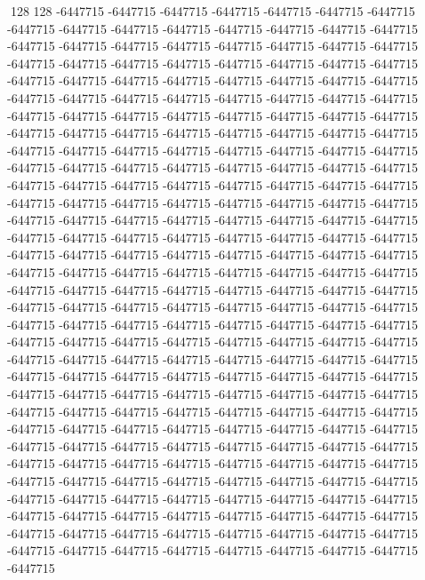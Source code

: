 128 128
-6447715 -6447715 -6447715 -6447715 -6447715 -6447715 -6447715 -6447715 -6447715 -6447715 -6447715 -6447715 -6447715 -6447715 -6447715 -6447715 -6447715 -6447715 -6447715 -6447715 -6447715 -6447715 -6447715 -6447715 -6447715 -6447715 -6447715 -6447715 -6447715 -6447715 -6447715 -6447715 -6447715 -6447715 -6447715 -6447715 -6447715 -6447715 -6447715 -6447715 -6447715 -6447715 -6447715 -6447715 -6447715 -6447715 -6447715 -6447715 -6447715 -6447715 -6447715 -6447715 -6447715 -6447715 -6447715 -6447715 -6447715 -6447715 -6447715 -6447715 -6447715 -6447715 -6447715 -6447715 -6447715 -6447715 -6447715 -6447715 -6447715 -6447715 -6447715 -6447715 -6447715 -6447715 -6447715 -6447715 -6447715 -6447715 -6447715 -6447715 -6447715 -6447715 -6447715 -6447715 -6447715 -6447715 -6447715 -6447715 -6447715 -6447715 -6447715 -6447715 -6447715 -6447715 -6447715 -6447715 -6447715 -6447715 -6447715 -6447715 -6447715 -6447715 -6447715 -6447715 -6447715 -6447715 -6447715 -6447715 -6447715 -6447715 -6447715 -6447715 -6447715 -6447715 -6447715 -6447715 -6447715 -6447715 -6447715 -6447715 -6447715 -6447715 -6447715 -6447715 -6447715 -6447715 -6447715 -6447715
-6447715 -6447715 -6447715 -6447715 -6447715 -6447715 -6447715 -6447715 -6447715 -6447715 -6447715 -6447715 -6447715 -6447715 -6447715 -6447715 -6447715 -6447715 -6447715 -6447715 -6447715 -6447715 -6447715 -6447715 -6447715 -6447715 -6447715 -6447715 -6447715 -6447715 -6447715 -6447715 -6447715 -6447715 -6447715 -6447715 -6447715 -6447715 -6447715 -6447715 -6447715 -6447715 -6447715 -6447715 -6447715 -6447715 -6447715 -6447715 -6447715 -6447715 -6447715 -6447715 -6447715 -6447715 -6447715 -6447715 -6447715 -6447715 -6447715 -6447715 -6447715 -6447715 -6447715 -6447715 -6447715 -6447715 -6447715 -6447715 -6447715 -6447715 -6447715 -6447715 -6447715 -6447715 -6447715 -6447715 -6447715 -6447715 -6447715 -6447715 -6447715 -6447715 -6447715 -6447715 -6447715 -6447715 -6447715 -6447715 -6447715 -6447715 -6447715 -6447715 -6447715 -6447715 -6447715 -6447715 -6447715 -6447715 -6447715 -6447715 -6447715 -6447715 -6447715 -6447715 -6447715 -6447715 -6447715 -6447715 -6447715 -6447715 -6447715 -6447715 -6447715 -6447715 -6447715 -6447715 -6447715 -6447715 -6447715 -6447715 -6447715 -6447715 -6447715 -6447715 -6447715 -6447715 -6447715 -6447715
